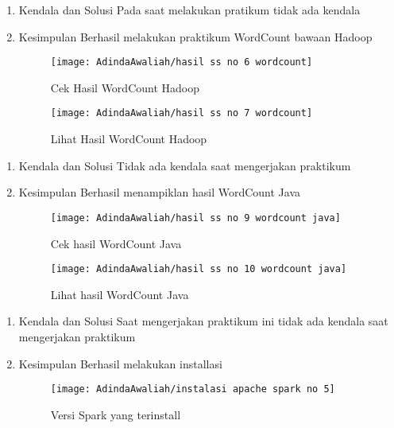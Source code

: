 \begin{enumerate}
\item Kendala dan Solusi
\newline Pada saat melakukan pratikum tidak ada kendala

\item Kesimpulan
\newline Berhasil melakukan praktikum WordCount bawaan Hadoop

\begin{figure}[!ht]
\texttt{[image: AdindaAwaliah/hasil ss no 6 wordcount]}
\caption{Cek Hasil WordCount Hadoop}
\label{gam:hasil ss no 6 wordcount}
\end{figure}

\begin{figure}[!ht]
\texttt{[image: AdindaAwaliah/hasil ss no 7 wordcount]}
\caption{Lihat Hasil WordCount Hadoop}
\label{gam:hasil ss no 7 wordcount}
\end{figure}

\end{enumerate}

\begin{enumerate}
\item Kendala dan Solusi
\newline Tidak ada kendala saat mengerjakan praktikum

\item Kesimpulan
\newline Berhasil menampiklan hasil WordCount Java

\begin{figure}[!ht]
\texttt{[image: AdindaAwaliah/hasil ss no 9 wordcount java]}
\caption{Cek hasil WordCount Java}
\label{gam:hasil ss no 9 wordcount java}
\end{figure}

\begin{figure}[!ht]
\texttt{[image: AdindaAwaliah/hasil ss no 10 wordcount java]}
\caption{Lihat hasil WordCount Java}
\label{gam:hasil ss no 9 wordcount java}
\end{figure}

\end{enumerate}

\begin{enumerate}
\item Kendala dan Solusi
\newline Saat mengerjakan praktikum ini tidak ada kendala saat mengerjakan praktikum

\item Kesimpulan
\newline Berhasil melakukan installasi

\begin{figure}[!ht]
\texttt{[image: AdindaAwaliah/instalasi apache spark no 5]}
\caption{Versi Spark yang terinstall}
\label{gam:instalasi apache spark no 5}
\end{figure}

\end{enumerate}

